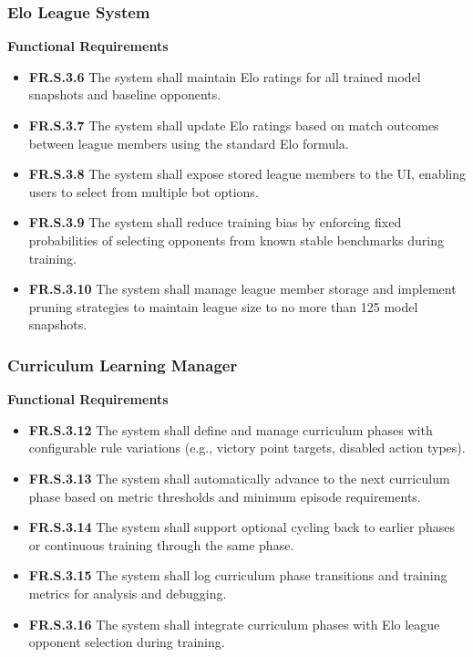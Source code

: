 \documentclass{article}
\begin{document}
\subsubsection{Elo League System}

\textbf{Functional Requirements}

\begin{itemize}
  \item \label{FR.S.3.6}\textbf{FR.S.3.6} The system shall maintain Elo ratings for all trained model snapshots and baseline opponents.
  \item \label{FR.S.3.7}\textbf{FR.S.3.7} The system shall update Elo ratings based on match outcomes between league members using the standard Elo formula.
  \item \label{FR.S.3.8}\textbf{FR.S.3.8} The system shall expose stored league members to the UI, enabling users to select from multiple bot options.
  \item \label{FR.S.3.9}\textbf{FR.S.3.9} The system shall reduce training bias by enforcing fixed probabilities of selecting opponents from known stable benchmarks during training.
  \item \label{FR.S.3.10}\textbf{FR.S.3.10} The system shall manage league member storage and implement pruning strategies to maintain league size to no more than 125 model snapshots.
\end{itemize}

\subsubsection{Curriculum Learning Manager}

\textbf{Functional Requirements}

\begin{itemize}
  \item \label{FR.S.3.12}\textbf{FR.S.3.12} The system shall define and manage curriculum phases with configurable rule variations (e.g., victory point targets, disabled action types).
  \item \label{FR.S.3.13}\textbf{FR.S.3.13} The system shall automatically advance to the next curriculum phase based on metric thresholds and minimum episode requirements.
  \item \label{FR.S.3.14}\textbf{FR.S.3.14} The system shall support optional cycling back to earlier phases or continuous training through the same phase.
  \item \label{FR.S.3.15}\textbf{FR.S.3.15} The system shall log curriculum phase transitions and training metrics for analysis and debugging.
  \item \label{FR.S.3.16}\textbf{FR.S.3.16} The system shall integrate curriculum phases with Elo league opponent selection during training.
\end{itemize}
\end{document}
